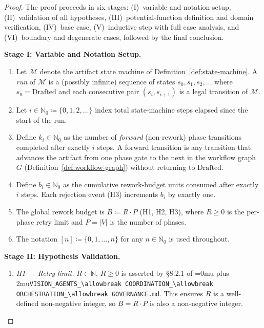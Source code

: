 \documentclass[12pt]{article}
\theoremstyle{definition}
\DeclareRobustCommand{\code}[1]{\begingroup\Urlmuskip=0mu plus 2mu\relax\nolinkurl{#1}\endgroup}
\newcommand{\VisionGov}{\code{VISION\_AGENTS\_\allowbreak COORDINATION\_\allowbreak ORCHESTRATION\_\allowbreak GOVERNANCE.md}}
\begin{document}
\begin{proof}
The proof proceeds in six stages: (I)~variable and notation setup,
(II)~validation of all hypotheses, (III)~potential-function definition
and domain verification, (IV)~base case, (V)~inductive step with full
case analysis, and (VI)~boundary and degenerate cases, followed by the
final conclusion.

\medskip
\noindent\textbf{Stage I: Variable and Notation Setup.}

\begin{enumerate}
  \item Let $\mathcal{M}$ denote the artifact state machine of
        Definition~\ref{def:state-machine}.  A \emph{run} of
        $\mathcal{M}$ is a (possibly infinite) sequence of states
        $s_0, s_1, s_2, \ldots$ where $s_0 = \mathrm{Drafted}$ and
        each consecutive pair $(s_i, s_{i+1})$ is a legal transition
        of $\mathcal{M}$.

  \item Let $i \in \mathbb{N}_0 \coloneqq \{0,1,2,\ldots\}$ index
        total state-machine steps elapsed since the start of the run.

  \item Define $k_i \in \mathbb{N}_0$ as the number of
        \emph{forward} (non-rework) phase transitions completed after
        exactly $i$ steps.  A forward transition is any transition
        that advances the artifact from one phase gate to the next in
        the workflow graph $G$ (Definition~\ref{def:workflow-graph})
        without returning to $\mathrm{Drafted}$.

  \item Define $b_i \in \mathbb{N}_0$ as the cumulative
        rework-budget units consumed after exactly $i$ steps.  Each
        rejection event (H3) increments $b_i$ by exactly one.

  \item The global rework budget is $B \coloneqq R \cdot P$ (H1,
        H2, H3), where $R \geq 0$ is the per-phase retry limit and
        $P = |V|$ is the number of phases.

  \item The notation $[n] \coloneqq \{0, 1, \ldots, n\}$ for any
        $n \in \mathbb{N}_0$ is used throughout.
\end{enumerate}

\medskip
\noindent\textbf{Stage II: Hypothesis Validation.}

\begin{enumerate}
  \item \emph{H1 — Retry limit.}  $R \in \mathbb{N}$, $R \geq 0$ is
        asserted by \S8.2.1 of
        \VisionGov{}.  This ensures $R$ is a well-defined
        non-negative integer, so $B = R \cdot P$ is also a
        non-negative integer.


\end{enumerate}
\end{proof}
\end{document}
